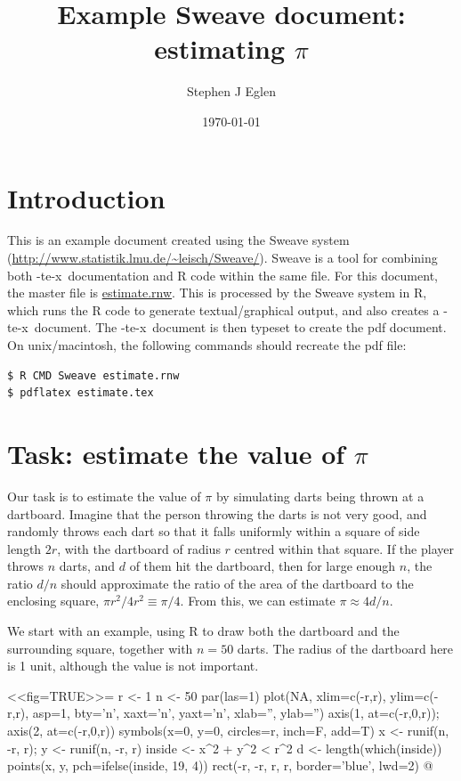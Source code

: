 \documentclass[12pt]{article}
\begin{document}
\title{Example Sweave document: estimating $\pi$}
\author{Stephen J Eglen}

\date{\today}
\maketitle

\section{Introduction}

This is an example document created using the Sweave system
(\url{http://www.statistik.lmu.de/~leisch/Sweave/}).  Sweave is a
tool for combining both \la-te-x\ documentation and R code within the
same file.  For this document, the master file is \url{estimate.rnw}.
This is processed by the Sweave system in R, which runs the R code to
generate textual/graphical output, and also creates a \la-te-x\ document.
The \la-te-x\ document is then typeset to create the pdf document.  On
unix/macintosh, the following commands should recreate the pdf file:

\begin{verbatim}
$ R CMD Sweave estimate.rnw
$ pdflatex estimate.tex
\end{verbatim}

\section{Task: estimate the value of $\pi$}

Our task is to estimate the value of $\pi$ by simulating darts being
thrown at a dartboard.  Imagine that the person throwing the darts is
not very good, and randomly throws each dart so that it falls
uniformly within a square of side length $2r$, with the dartboard of
radius $r$ centred within that square.  If the player throws $n$
darts, and $d$ of them hit the dartboard, then for large enough $n$,
the ratio $d/n$ should approximate the ratio of the area of the
dartboard to the enclosing square, $ \pi r^2 / 4 r^2 \equiv \pi/4$.
From this, we can estimate $\pi \approx 4d/n$.

We start with an example, using R to draw both the dartboard and the
surrounding square, together with $n=50$ darts.  The radius of the
dartboard here is 1 unit, although the value is not important.

\begin{center}
<<fig=TRUE>>=
r <- 1
n <- 50
par(las=1)
plot(NA, xlim=c(-r,r), ylim=c(-r,r), asp=1, bty='n',
     xaxt='n', yaxt='n', xlab='', ylab='')
axis(1, at=c(-r,0,r)); axis(2, at=c(-r,0,r))
symbols(x=0, y=0, circles=r, inch=F, add=T)
x <- runif(n, -r, r);  y <- runif(n, -r, r)
inside <- x^2 + y^2 < r^2
d <- length(which(inside))
points(x, y, pch=ifelse(inside, 19, 4))
rect(-r, -r, r, r, border='blue', lwd=2)
@ 
\end{center}
\end{document}
